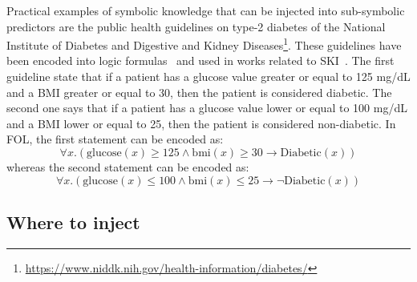 Practical examples of symbolic knowledge that can be injected into sub-symbolic predictors are the public health guidelines on type-2 diabetes of the National Institute of Diabetes and Digestive and Kidney Diseases\footnote{\url{https://www.niddk.nih.gov/health-information/diabetes/}}.
%
These guidelines have been encoded into logic formulas~\cite{DBLP:conf/pkdd/KunapuliBSMS10} and used in works related to \gls{SKI}~\cite{Magnini-telmed2025}.
%
The first guideline state that if a patient has a glucose value greater or equal to 125 mg/dL and a \gls{BMI} greater or equal to 30, then the patient is considered diabetic.
%
The second one says that if a patient has a glucose value lower or equal to 100 mg/dL and a \gls{BMI} lower or equal to 25, then the patient is considered non-diabetic.
%
In \gls{FOL}, the first statement can be encoded as:
%
\begin{equation}\label{eq:rule-diabetic}
  \forall x . ( \text{glucose}(x) \geq 125 \land \text{bmi}(x) \geq 30 \rightarrow \text{Diabetic}(x))
\end{equation}
%
whereas the second statement can be encoded as:
%
\begin{equation}\label{eq:rule-not-diabetic}
  \forall x . ( \text{glucose}(x) \leq 100 \land \text{bmi}(x) \leq 25 \rightarrow \neg \text{Diabetic}(x))
\end{equation}


\subsection{Where to inject}\label{subsec:where-to-inject}


